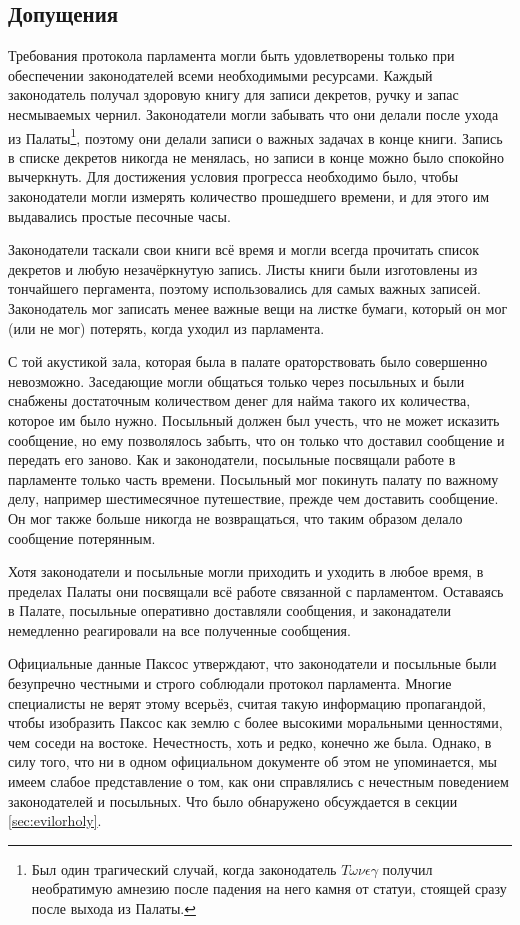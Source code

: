 \documentclass[12pt, a4paper]{article} %
\begin{document}
\subsection{Допущения}

Требования протокола парламента могли быть удовлетворены только при обеспечении законодателей всеми необходимыми ресурсами. Каждый законодатель получал здоровую книгу для записи декретов, ручку и запас несмываемых чернил. Законодатели могли забывать что они делали после ухода из Палаты\footnote{Был один трагический случай, когда законодатель $T\omega\nu\epsilon\gamma$ получил необратимую амнезию после падения на него камня от статуи, стоящей сразу после выхода из Палаты.}, поэтому они делали записи о важных задачах в конце книги. Запись в списке декретов никогда не менялась, но записи в конце можно было спокойно вычеркнуть. Для достижения условия прогресса необходимо было, чтобы законодатели могли измерять количество прошедшего времени, и для этого им выдавались простые песочные часы.

Законодатели таскали свои книги всё время и могли всегда прочитать список декретов и любую незачёркнутую запись. Листы книги были изготовлены из тончайшего пергамента, поэтому использовались для самых важных записей. Законодатель мог записать менее важные вещи на листке бумаги, который он мог (или не мог) потерять, когда уходил из парламента.

С той акустикой зала, которая была в палате ораторствовать было совершенно невозможно. Заседающие могли общаться только через посыльных и были снабжены достаточным количеством денег для найма такого их количества, которое им было нужно. Посыльный должен был учесть, что не может исказить сообщение, но ему позволялось забыть, что он только что доставил сообщение и передать его заново. Как и законодатели, посыльные посвящали работе в парламенте только часть времени. Посыльный мог покинуть палату по важному делу, например шестимесячное путешествие, прежде чем доставить сообщение. Он мог также больше никогда не возвращаться, что таким образом делало сообщение потерянным.

Хотя законодатели и посыльные могли приходить и уходить в любое время, в пределах Палаты они посвящали всё работе связанной с парламентом. Оставаясь в Палате, посыльные оперативно доставляли сообщения, и  законадатели немедленно реагировали на все полученные сообщения.

Официальные данные Паксос утверждают, что законодатели и посыльные были безупречно честными и строго соблюдали протокол парламента. Многие специалисты не верят этому всерьёз, считая такую информацию пропагандой, чтобы изобразить Паксос как землю с более высокими моральными ценностями, чем соседи на востоке. Нечестность, хоть и редко, конечно же была. Однако, в силу того, что ни в одном официальном документе об этом не упоминается, мы имеем слабое представление о том, как они справлялись с нечестным поведением законодателей и посыльных. Что было обнаружено обсуждается в секции \ref{sec:evilorholy}.
\end{document}
